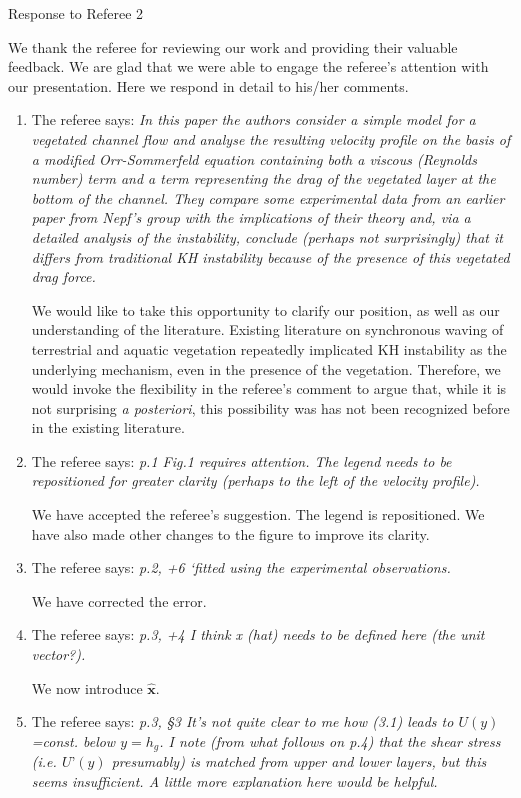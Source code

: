 \documentclass[letterpaper,10pt]{article}
\newcommand{\bx}{\mathbf{x}}
\begin{document}
\newpage
\centerline{Response to Referee 2}
We thank the referee for reviewing our work and providing their valuable feedback. 
We are glad that we were able to engage the referee's attention with our presentation.
Here we respond in detail to his/her comments.
\begin{enumerate}
\item The referee says:
\textit{
In this paper the authors consider a simple model for a vegetated channel flow and analyse the resulting velocity profile on the basis of a modified Orr-Sommerfeld equation containing both a viscous (Reynolds number) term and a term representing the drag of the vegetated layer at the bottom of the channel. They compare some experimental data from an earlier paper from Nepf’s group with the implications of their theory and, via a detailed analysis of the instability, conclude (perhaps not surprisingly) that it differs from traditional KH instability because of the presence of this vegetated drag force.
}

We would like to take this opportunity to clarify our position, as well as our understanding of the literature.
Existing literature on synchronous waving of terrestrial and aquatic vegetation repeatedly implicated KH instability as the underlying mechanism, even in the presence of the vegetation. 
Therefore, we would invoke the flexibility in the referee's comment to argue that, while it is not surprising \textit{a posteriori}, this possibility was has not been recognized before in the existing literature.

\item The referee says:
\textit{p.1 Fig.1 requires attention. The legend needs to be repositioned for greater
clarity (perhaps to the left of the velocity profile).}

We have accepted the referee's suggestion. The legend is repositioned. We have also made other changes to the figure to improve its clarity.

\item The referee says:
\textit{
p.2, +6 ‘fitted using the experimental observations.
}

We have corrected the error.

\item The referee says:
\textit{
p.3, +4 I think x (hat) needs to be defined here (the unit vector?).
}

We now introduce $\hat{\bx}$.

\item The referee says:
\textit{
p.3, \S 3 It’s not quite clear to me how (3.1) leads to $U(y)$=const. below $y=h_g$. I note (from what follows on p.4) that the shear stress (i.e. $U’(y)$ presumably) is
matched from upper and lower layers, but this seems insufficient. A little more explanation here would be helpful.
}


\end{enumerate}
\end{document}
